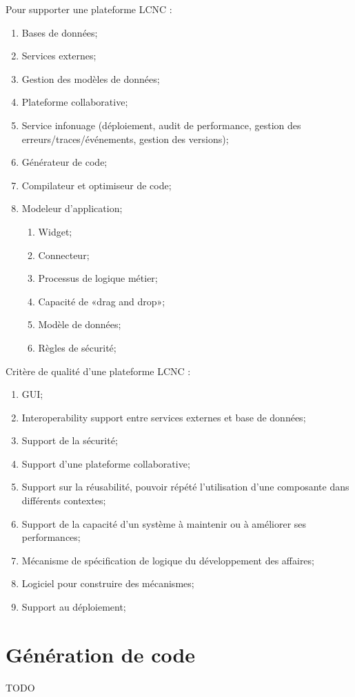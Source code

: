 Pour supporter une plateforme LCNC :
\begin{enumerate}
    \item Bases de données;
    \item Services externes;
    \item Gestion des modèles de données;
    \item Plateforme collaborative;
    \item Service infonuage (déploiement, audit de performance, gestion des erreurs/traces/événements, gestion des versions);
    \item Générateur de code;
    \item Compilateur et optimiseur de code;
    \item Modeleur d’application;
    \begin{enumerate}
        \item Widget;
        \item Connecteur;
        \item Processus de logique métier;
        \item Capacité de «drag and drop»;
        \item Modèle de données;
        \item Règles de sécurité;
    \end{enumerate}
\end{enumerate}
Critère de qualité d’une plateforme LCNC :
\begin{enumerate}
    \item GUI;
    \item Interoperability support entre services externes et base de données;
    \item Support de la sécurité;
    \item Support d’une plateforme collaborative;
    \item Support sur la réusabilité, pouvoir répété l’utilisation d’une composante dans différents contextes;
    \item Support de la capacité d’un système à maintenir ou à améliorer ses performances;
    \item Mécanisme de spécification de logique du développement des affaires;
    \item Logiciel pour construire des mécanismes;
    \item Support au déploiement;
\end{enumerate}

\section{Génération de code}
TODO

